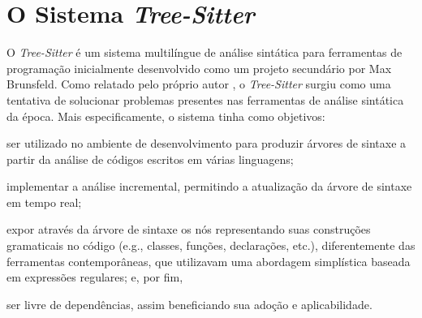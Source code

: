 \documentclass
  [11pt,a4paper,english,brazil,openright,sumario=tradicional,twoside]
  {abntex2}
\newcommand{\treesitter}{\textit{Tree-Sitter}\xspace}
\begin{document}

  \chapter{O Sistema \treesitter}
  \label{chapter:tree-sitter}

  O \treesitter é um sistema multilíngue de análise sintática para ferramentas
  de programação inicialmente desenvolvido como um projeto secundário por Max
  Brunsfeld. Como relatado pelo próprio autor \cite{github-2017-tree}, o
  \treesitter surgiu como uma tentativa de solucionar problemas presentes nas
  ferramentas de análise sintática da época. Mais especificamente, o sistema
  tinha como objetivos:
  \begin{inparaenum}
    \item ser utilizado no ambiente de desenvolvimento para produzir árvores de
          sintaxe a partir da análise de códigos escritos em várias linguagens;
    \item implementar a análise incremental, permitindo a atualização da árvore
          de sintaxe em tempo real;
    \item expor através da árvore de sintaxe os nós representando suas
          construções gramaticais no código (e.g., classes, funções,
          declarações, etc.), diferentemente das ferramentas contemporâneas,
          que utilizavam uma abordagem simplística baseada em expressões
          regulares; e, por fim,
    \item ser livre de dependências, assim beneficiando sua adoção e
          aplicabilidade.
  \end{inparaenum}
\end{document}
